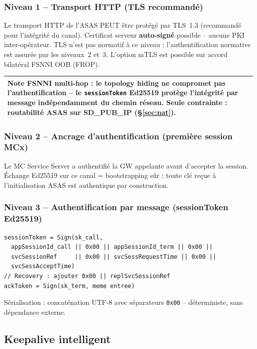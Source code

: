 \documentclass[11pt,a4paper]{article}
\newenvironment{notebox}{%
  \begin{center}\begin{tabular}{|p{0.93\textwidth}|}\hline\rowcolor{noteblue}
}{\\\hline\end{tabular}\end{center}}
\begin{document}
\subsubsection*{Niveau 1 -- Transport HTTP (TLS recommandé)}

Le transport HTTP de l'ASAS PEUT être protégé par TLS~1.3 (recommandé pour
l'intégrité du canal). Certificat serveur \textbf{auto-signé} possible -- aucune PKI
inter-opérateur. TLS n'est pas normatif à ce niveau ; l'authentification normative
est assurée par les niveaux~2 et~3. L'option mTLS est possible sur accord bilatéral
FSNNI OOB (FROP).

\begin{notebox}
  \textbf{Note FSNNI multi-hop} : le topology hiding ne compromet pas
  l'authentification -- le \texttt{sessionToken} Ed25519 protège l'intégrité par
  message indépendamment du chemin réseau. Seule contrainte : routabilité ASAS sur
  SD\_PUB\_IP (§\ref{sec:nat}).
\end{notebox}

\subsubsection*{Niveau 2 -- Ancrage d'authentification (première session MCx)}

Le MC Service Server a authentifié la GW appelante avant d'accepter la session.
Échange Ed25519 sur ce canal = bootstrapping sûr : toute clé reçue à l'initialisation
ASAS est authentique par construction.

\subsubsection*{Niveau 3 -- Authentification par message (sessionToken Ed25519)}

\begin{lstlisting}[language={}]
sessionToken = Sign(sk_call,
  appSessionId_call || 0x00 || appSessionId_term || 0x00 ||
  svcSessionRef     || 0x00 || svcSessRequestTime || 0x00 ||
  svcSessAcceptTime)
// Recovery : ajouter 0x00 || replSvcSessionRef
ackToken = Sign(sk_term, meme entree)
\end{lstlisting}

Sérialisation : concaténation UTF-8 avec séparateurs \texttt{0x00} -- déterministe,
sans dépendance externe.

\subsection{Keepalive intelligent}
\label{sec:ka}
\end{document}
